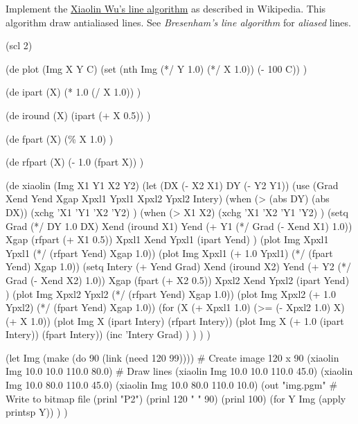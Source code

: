 Implement the
\href{http://en.wikipedia.org/wiki/Xiaolin\_Wu\%27s\_line\_algorithm}{Xiaolin
  Wu's line algorithm} as described in Wikipedia. This algorithm draw
antialiased lines. See \emph{Bresenham's line algorithm} for
\emph{aliased} lines.


\begin{wideverbatim}

(scl 2)

(de plot (Img X Y C)
   (set (nth Img (*/ Y 1.0) (*/ X 1.0)) (- 100 C)) )

(de ipart (X)
   (* 1.0 (/ X 1.0)) )

(de iround (X)
   (ipart (+ X 0.5)) )

(de fpart (X)
   (\% X 1.0) )

(de rfpart (X)
   (- 1.0 (fpart X)) )


\end{wideverbatim}

\begin{wideverbatim}


(de xiaolin (Img X1 Y1 X2 Y2)
   (let (DX (- X2 X1)  DY (- Y2 Y1))
      (use (Grad Xend Yend Xgap Xpxl1 Ypxl1 Xpxl2 Ypxl2 Intery)
         (when (> (abs DY) (abs DX))
            (xchg 'X1 'Y1  'X2 'Y2) )
         (when (> X1 X2)
            (xchg 'X1 'X2  'Y1 'Y2) )
         (setq
            Grad (*/ DY 1.0 DX)
            Xend (iround X1)
            Yend (+ Y1 (*/ Grad (- Xend X1) 1.0))
            Xgap (rfpart (+ X1 0.5))
            Xpxl1 Xend
            Ypxl1 (ipart Yend) )
         (plot Img Xpxl1 Ypxl1 (*/ (rfpart Yend) Xgap 1.0))
         (plot Img Xpxl1 (+ 1.0 Ypxl1) (*/ (fpart Yend) Xgap 1.0))
         (setq
            Intery (+ Yend Grad)
            Xend (iround X2)
            Yend (+ Y2 (*/ Grad (- Xend X2) 1.0))
            Xgap (fpart (+ X2 0.5))
            Xpxl2 Xend
            Ypxl2 (ipart Yend) )
         (plot Img Xpxl2 Ypxl2 (*/ (rfpart Yend) Xgap 1.0))
         (plot Img Xpxl2 (+ 1.0 Ypxl2) (*/ (fpart Yend) Xgap 1.0))
         (for (X (+ Xpxl1 1.0)  (>= (- Xpxl2 1.0) X)  (+ X 1.0))
            (plot Img X (ipart Intery) (rfpart Intery))
            (plot Img X (+ 1.0 (ipart Intery)) (fpart Intery))
            (inc 'Intery Grad) ) ) ) )

(let Img (make (do 90 (link (need 120 99))))       # Create image 120 x 90
   (xiaolin Img 10.0 10.0 110.0 80.0)              # Draw lines
   (xiaolin Img 10.0 10.0 110.0 45.0)
   (xiaolin Img 10.0 80.0 110.0 45.0)
   (xiaolin Img 10.0 80.0 110.0 10.0)
   (out "img.pgm"                                  # Write to bitmap file
      (prinl "P2")
      (prinl 120 " " 90)
      (prinl 100)
      (for Y Img (apply printsp Y)) ) )

\end{wideverbatim}



% 
